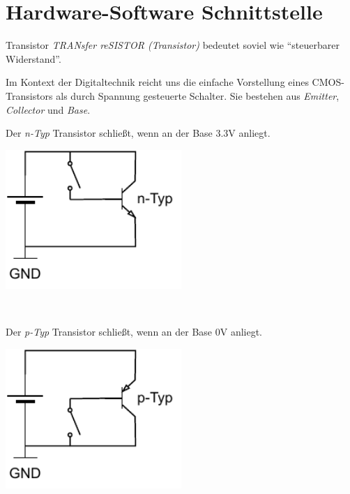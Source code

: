 \section{Hardware-Software Schnittstelle}

\begin{defi}{Transistor}
    \emph{TRANsfer reSISTOR (Transistor)} bedeutet soviel wie \enquote{steuerbarer Widerstand}.

    Im Kontext der Digitaltechnik reicht uns die einfache Vorstellung eines CMOS-Transistors als durch Spannung gesteuerte Schalter.
    Sie bestehen aus \emph{Emitter}, \emph{Collector} und \emph{Base}.

    \begin{minipage}[t]{0.45\textwidth}
        Der \emph{n-Typ} Transistor schließt, wenn an der Base 3.3V anliegt.

        \begin{center}
            \includegraphics[width=0.5\textwidth]{includes/figures/defi_npn.pdf}
        \end{center}
    \end{minipage}
    \begin{minipage}[t]{0.1\textwidth}
        \
    \end{minipage}
    \begin{minipage}[t]{0.45\textwidth}
        Der \emph{p-Typ} Transistor schließt, wenn an der Base 0V anliegt.

        \begin{center}
            \includegraphics[width=0.5\textwidth]{includes/figures/defi_pnp.pdf}
        \end{center}
    \end{minipage}
\end{defi}

